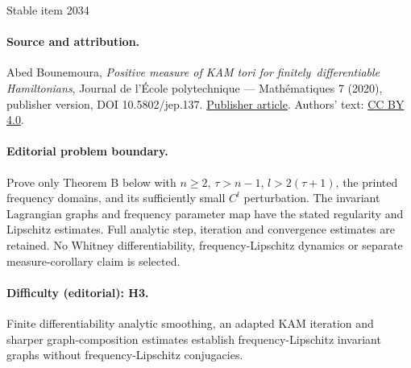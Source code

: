 \documentclass[11pt]{article}
\begin{document}
\begin{center}{\Large Stable item 2034}\end{center}
\paragraph{Source and attribution.}
Abed Bounemoura, \emph{Positive measure of KAM tori for finitely differentiable Hamiltonians}, Journal de l’École polytechnique — Mathématiques 7 (2020), publisher version, DOI 10.5802/jep.137. \href{https://jep.centre-mersenne.org/articles/10.5802/jep.137/}{Publisher article}. Authors' text: \href{https://creativecommons.org/licenses/by/4.0/}{CC BY 4.0}.
\paragraph{Editorial problem boundary.}
Prove only Theorem B below with \(n\ge2\), \(\tau>n-1\), \(l>2(\tau+1)\), the printed frequency domains, and its sufficiently small \(C^l\) perturbation. The invariant Lagrangian graphs and frequency parameter map have the stated regularity and Lipschitz estimates. Full analytic step, iteration and convergence estimates are retained. No Whitney differentiability, frequency-Lipschitz dynamics or separate measure-corollary claim is selected.
\paragraph{Difficulty (editorial): H3.}
Finite differentiability analytic smoothing, an adapted KAM iteration and sharper graph-composition estimates establish frequency-Lipschitz invariant graphs without frequency-Lipschitz conjugacies.
\end{document}
